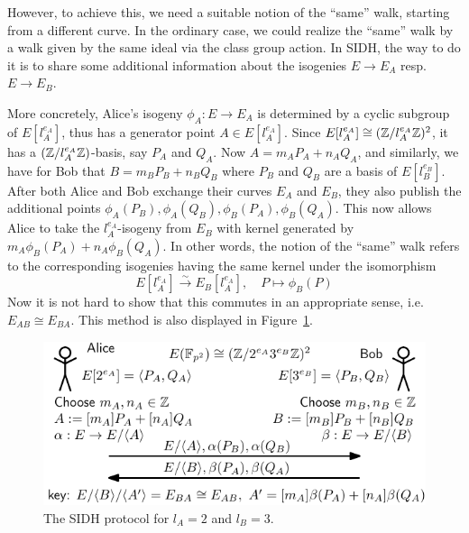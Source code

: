 However, to achieve this, we need a suitable notion of the ``same'' walk, starting from a different curve.
In the ordinary case, we could realize the ``same'' walk by a walk given by the same ideal via the class group action.
In SIDH, the way to do it is to share some additional information about the isogenies $E \to E_A$ resp. $E \to E_B$.

More concretely, Alice's isogeny $\phi_A: E \to E_A$ is determined by a cyclic subgroup of $E[l_A^{e_A}]$, thus has a generator point $A \in E[l_A^{e_A}]$.
Since $E[l_A^{e_A}] \cong (\mathbb{Z}/l_A^{e_A}\mathbb{Z})^2$, it has a $(\mathbb{Z}/l_A^{e_A}\mathbb{Z})$-basis, say $P_A$ and $Q_A$.
Now $A = m_A P_A + n_A Q_A$, and similarly, we have for Bob that $B = m_B P_B + n_B Q_B$ where $P_B$ and $Q_B$ are a basis of $E[l_B^{e_B}]$.
After both Alice and Bob exchange their curves $E_A$ and $E_B$, they also publish the additional points $\phi_A(P_B), \phi_A(Q_B), \phi_B(P_A), \phi_B(Q_A)$.
This now allows Alice to take the $l_A^{e_A}$-isogeny from $E_B$ with kernel generated by $m_A \phi_B(P_A) + n_A \phi_B(Q_A)$.
In other words, the notion of the ``same'' walk refers to the corresponding isogenies having the same kernel under the isomorphism
\begin{equation*}
    E[l_A^{e_A}] \overset{\sim}{\longrightarrow} E_B[l_A^{e_A}], \quad P \mapsto \phi_B(P)
\end{equation*}
Now it is not hard to show that this commutes in an appropriate sense, i.e. $E_{AB} \cong E_{BA}$.
This method is also displayed in Figure~\ref{fig:sidh}.
\begin{figure}
    \includegraphics[width = \textwidth]{./sidh.pdf}
    \caption{\label{fig:sidh} The SIDH protocol for $l_A = 2$ and $l_B = 3$.}
\end{figure}

